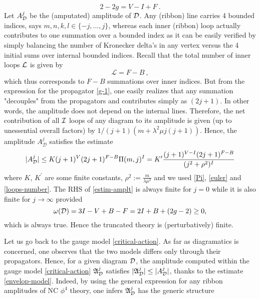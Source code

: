 \documentclass[a4paper,11pt,twoside]{article}
\numberwithin{equation}{section}
\theoremstyle{nonumberplain}
\newcounter{and}
\begin{document}
%
\begin{equation}
2-2g=V-I+F \ . \label{euler}
\end{equation}
%
Let ${A}^j_{{\cal{D}}}$ be the (amputated) amplitude of ${\cal{D}}$. Any (ribbon) line carries 4 bounded indices, says $m,n,k,l\in\{-j,...,j\}$, whereas each inner (ribbon) loop actually contributes to one summation over a bounded index as it can be easily verified by simply balancing the number of Kronecker delta's in any vertex versus the 4 initial sums over internal bounded indices. Recall that the total number of inner loops ${\cal{L}}$ is given by%
%
\begin{equation}
\mathcal{L}=F-B \ , \label{loops-number}
\end{equation}
%
which thus corresponds to $F-B$ summations over inner indices. But from the expression for the propagator \eqref{g-1}, one easily realizes that any summation "decouples" from the propagators and contributes simply as $(2j+1)$. In other words, the amplitude does not depend on the internal lines. Therefore, the net contribution of all ${\cal{I}}$ loops of any diagram to its amplitude is given (up to unessential overall factors) by $1/(j+1)(m+\lambda^2\mu j(j+1))$. Hence, the amplitude $A^j_\mathcal{D}$ satisfies the estimate%
%
\begin{equation}
\vert A^j_{{\cal{D}}}\vert \le K(j+1)^V(2j+1)^{F-B}\Pi(m,j)^I=K^\prime\frac{(j+1)^{V-I}(2j+1)^{F-B}}{(j^2+\rho^2)^{I}}\label{estim-amplt}
\end{equation}
%
where $K$, $K^\prime$ are some finite constants, $\rho^2:=\frac{m}{\lambda\mu^2}$ and we used \eqref{Pi}, \eqref{euler} and \eqref{loops-number}. The RHS of \eqref{estim-amplt} is always finite for $j=0$ while it is also finite for $j\to\infty$ provided%
%
\begin{equation}
\omega({\cal{D}})=3I-V+B-F=2I+B+(2g-2)\ge0,\label{power-count}
\end{equation}
%
which is always true. Hence the truncated theory is (perturbatively) finite.\par%
%
Let us go back to the gauge model \eqref{critical-action}. As far as diagramatics is concerned, one observes that the two models differs only through their propagators. Hence, for a given diagram ${\cal{D}}$, the amplitude computed within the gauge model \eqref{critical-action} $\mathfrak{A}^j_{{\cal{D}}}$ satisfies $\vert \mathfrak{A}^j_{{\cal{D}}}\vert\le \vert A^j_{{\cal{D}}}\vert$, thanks to the estimate \eqref{envelop-model}. Indeed, by using the general expression for any ribbon amplitudes of NC $\phi^4$ theory, one infers $\mathfrak{A}^j_{{\cal{D}}}$ has the generic structure%
\end{document}
